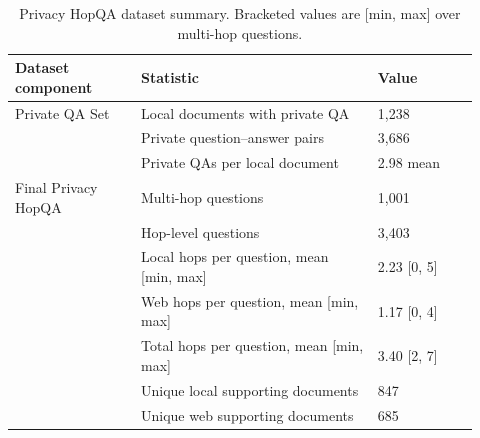 \begin{table}[t]
\centering
\small
\begin{tabular}{p{0.25\linewidth}p{0.47\linewidth}p{0.20\linewidth}}
\toprule
\textbf{Dataset component} & \textbf{Statistic} & \textbf{Value} \\
\midrule
Private QA Set & Local documents with private QA & 1,238 \\
 & Private question--answer pairs & 3,686 \\
 & Private QAs per local document & 2.98 mean \\
\midrule
Final Privacy HopQA & Multi-hop questions & 1,001 \\
 & Hop-level questions & 3,403 \\
 & Local hops per question, mean [min, max] & 2.23 [0, 5] \\
 & Web hops per question, mean [min, max] & 1.17 [0, 4] \\
 & Total hops per question, mean [min, max] & 3.40 [2, 7] \\
 & Unique local supporting documents & 847 \\
 & Unique web supporting documents & 685 \\
\bottomrule
\end{tabular}
\caption{Privacy HopQA dataset summary. Bracketed values are [min, max] over multi-hop questions.}
\label{tab:privacy_hopqa_dataset_summary}
\end{table}
